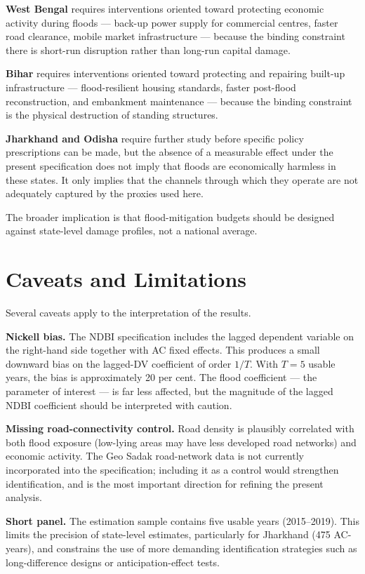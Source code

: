 \documentclass[12pt,a4paper,oneside]{report}
\begin{document}
\textbf{West Bengal} requires interventions oriented toward protecting economic activity during floods --- back-up power supply for commercial centres, faster road clearance, mobile market infrastructure --- because the binding constraint there is short-run disruption rather than long-run capital damage.

\textbf{Bihar} requires interventions oriented toward protecting and repairing built-up infrastructure --- flood-resilient housing standards, faster post-flood reconstruction, and embankment maintenance --- because the binding constraint is the physical destruction of standing structures.

\textbf{Jharkhand and Odisha} require further study before specific policy prescriptions can be made, but the absence of a measurable effect under the present specification does not imply that floods are economically harmless in these states. It only implies that the channels through which they operate are not adequately captured by the proxies used here.

The broader implication is that flood-mitigation budgets should be designed against state-level damage profiles, not a national average.

\section{Caveats and Limitations}
Several caveats apply to the interpretation of the results.

\textbf{Nickell bias.} The NDBI specification includes the lagged dependent variable on the right-hand side together with AC fixed effects. This produces a small downward bias on the lagged-DV coefficient of order $1/T$. With $T = 5$ usable years, the bias is approximately 20 per cent. The flood coefficient --- the parameter of interest --- is far less affected, but the magnitude of the lagged NDBI coefficient should be interpreted with caution.

\textbf{Missing road-connectivity control.} Road density is plausibly correlated with both flood exposure (low-lying areas may have less developed road networks) and economic activity. The Geo Sadak road-network data is not currently incorporated into the specification; including it as a control would strengthen identification, and is the most important direction for refining the present analysis.

\textbf{Short panel.} The estimation sample contains five usable years (2015--2019). This limits the precision of state-level estimates, particularly for Jharkhand (475 AC-years), and constrains the use of more demanding identification strategies such as long-difference designs or anticipation-effect tests.
\end{document}
